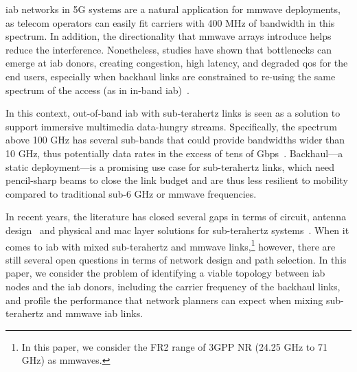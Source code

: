 \gls{iab} networks in 5G systems are a natural application for \gls{mmwave} deployments, as telecom operators can easily fit carriers with 400 MHz of bandwidth in this spectrum. In addition, the directionality that \gls{mmwave} arrays introduce helps reduce the interference. Nonetheless, studies have shown that bottlenecks can emerge at \gls{iab} donors, creating congestion, high latency, and degraded \gls{qos} for the end users, especially when backhaul links are constrained to re-using the same spectrum of the access (as in in-band \gls{iab})~\cite{polese2020integrated}.

In this context, out-of-band \gls{iab} with sub-terahertz links is seen as a solution
%
to support immersive multimedia data-hungry streams. 
%
Specifically, the spectrum above 100 GHz has several sub-bands that could provide bandwidths wider than 10 GHz, thus potentially data rates in the excess of tens of Gbps~\cite{akyildiz2014terahertz}. Backhaul---a static deployment---is a promising use case for sub-terahertz links, which need pencil-sharp beams to close the link budget and are thus less resilient to mobility compared to traditional sub-6 GHz or \gls{mmwave} frequencies. 

In recent years, the literature has closed several gaps in terms of circuit, antenna design~\cite{singh2020design} and physical and \gls{mac} layer solutions for sub-terahertz systems~\cite{ghafoor2020mac}.
%
When it comes to \gls{iab} with mixed sub-terahertz and \gls{mmwave} links,\footnote{In this paper, we consider the FR2 range of 3GPP NR (24.25 GHz to 71 GHz) as \glspl{mmwave}.} however, there are still several open questions in terms of network design and path selection. In this paper, we consider the problem of identifying a viable topology between \gls{iab} nodes and the \gls{iab} donors, including the carrier frequency of the backhaul links, and profile the performance that network planners can expect when mixing sub-terahertz and \gls{mmwave} \gls{iab} links.